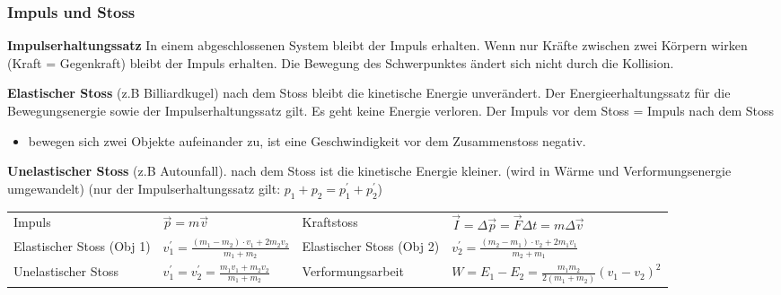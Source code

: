 \subsubsection{Impuls und Stoss}
 \textbf{Impulserhaltungssatz} In einem abgeschlossenen System bleibt der Impuls erhalten. Wenn nur Kräfte zwischen zwei Körpern wirken (Kraft = Gegenkraft) bleibt der Impuls erhalten. Die Bewegung des Schwerpunktes ändert sich nicht durch die Kollision.
 
\textbf{Elastischer Stoss}  (z.B Billiardkugel) nach dem Stoss bleibt die kinetische Energie unverändert. Der Energieerhaltungssatz für die Bewegungsenergie sowie der Impulserhaltungssatz gilt. Es geht keine Energie verloren. Der Impuls vor dem Stoss = Impuls nach dem Stoss
\begin{itemize}
	\item bewegen sich zwei Objekte aufeinander zu, ist eine Geschwindigkeit vor dem Zusammenstoss negativ.
\end{itemize}

\textbf{Unelastischer Stoss} (z.B Autounfall).
nach dem Stoss ist die kinetische Energie kleiner. (wird in Wärme und Verformungsenergie umgewandelt) (nur der Impulserhaltungssatz gilt: $p_1 + p_2 = p_1^{'} + p_2^{'}$)


\begin{tabbing}
	\begin{tabu} to \linewidth {X l X l}
		\toprule
		Impuls & $\vec{p} = m \vec{v}$  &
		Kraftstoss & $\vec{I} = \Delta \vec{p} = \vec{F} \Delta t = m \Delta \vec{v}$ \\
		Elastischer Stoss (Obj 1) & $v_1^{'} = \frac{(m_1 - m_2) \cdot v_1 + 2 m_2 v_2}{m_1+m_2}$  &
		Elastischer Stoss (Obj 2) & $v_2^{'} = \frac{(m_2 - m_1) \cdot v_2 + 2 m_1 v_1}{m_2+m_1}$ \\
		Unelastischer Stoss & $v_1^{'} = v_2^{'} = \frac{m_1v_1 + m_2v_2}{m_1 + m_2}$ & Verformungsarbeit & $W = E_1 - E_2 = \frac{m_1m_2}{2(m_1+m_2)}(v_1-v_2)^2$ \\
	\end{tabu}
\end{tabbing}

